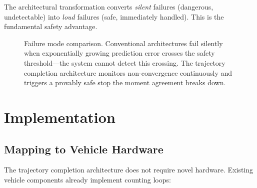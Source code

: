 \documentclass[twocolumn,10pt]{article}
\theoremstyle{definition}
\begin{document}
The architectural transformation converts \emph{silent} failures (dangerous, undetectable) into \emph{loud} failures (safe, immediately handled). This is the fundamental safety advantage.

\begin{figure}[t]
\centering
{}
\caption{Failure mode comparison. Conventional architectures fail silently when exponentially growing prediction error crosses the safety threshold---the system cannot detect this crossing. The trajectory completion architecture monitors non-convergence continuously and triggers a provably safe stop the moment agreement breaks down.}
\label{fig:failure-comparison}
\end{figure}


\section{Implementation}
\label{sec:implementation}

\subsection{Mapping to Vehicle Hardware}

The trajectory completion architecture does not require novel hardware. Existing vehicle components already implement counting loops:
\end{document}
